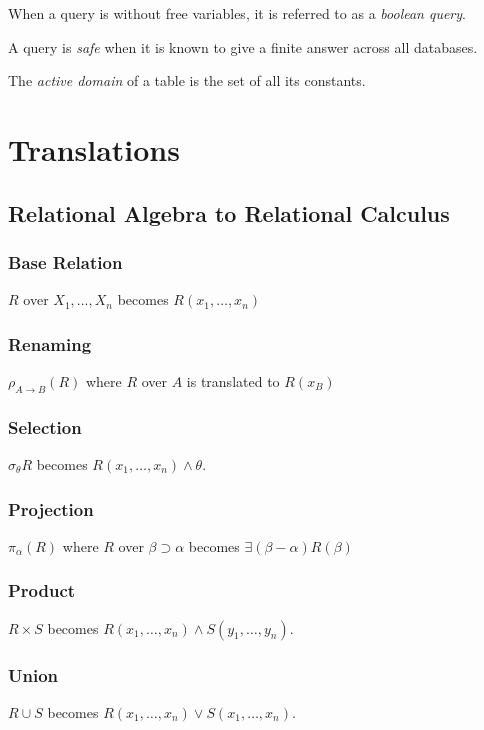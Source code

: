 \documentclass{article}
\begin{document}
When a query is without free variables, it is referred to as a \textit{boolean query}.

A query is \textit{safe} when it is known to give a finite answer across all databases.

The \textit{active domain} of a table is the set of all its constants.

\section{Translations}

\subsection{Relational Algebra to Relational Calculus}

\subsubsection*{Base Relation}

$R$ over $X_1,...,X_n$ becomes $R(x_1, \ldots, x_n)$

\subsubsection*{Renaming}
$\rho_{A\rightarrow B}(R)$ where $R$ over $A$ is translated to $R(x_B)$

\subsubsection*{Selection}
$\sigma_{\theta} R$ becomes $R(x_1, \ldots, x_n) \wedge \theta$.

\subsubsection*{Projection}
$\pi_{\alpha}(R)$ where $R$ over $\beta \supset \alpha$ becomes $\exists (\beta-\alpha) R(\beta)$

\subsubsection*{Product}
$R \times S$ becomes $R(x_1, \ldots, x_n) \wedge S(y_1, \ldots, y_n)$.

\subsubsection*{Union}
$R \cup S$ becomes $R(x_1, \ldots, x_n) \vee S(x_1, \ldots, x_n)$.
\end{document}
